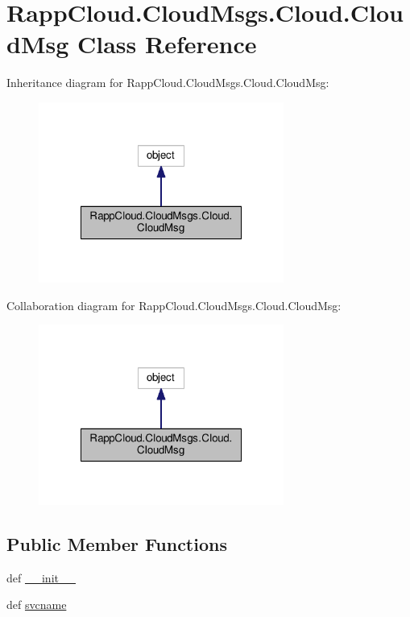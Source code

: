 \hypertarget{classRappCloud_1_1CloudMsgs_1_1Cloud_1_1CloudMsg}{\section{Rapp\-Cloud.\-Cloud\-Msgs.\-Cloud.\-Cloud\-Msg Class Reference}
\label{classRappCloud_1_1CloudMsgs_1_1Cloud_1_1CloudMsg}
}


Inheritance diagram for Rapp\-Cloud.\-Cloud\-Msgs.\-Cloud.\-Cloud\-Msg\-:
\nopagebreak
\begin{figure}[H]
\begin{center}
\leavevmode
\includegraphics[width=228pt]{classRappCloud_1_1CloudMsgs_1_1Cloud_1_1CloudMsg__inherit__graph}
\end{center}
\end{figure}


Collaboration diagram for Rapp\-Cloud.\-Cloud\-Msgs.\-Cloud.\-Cloud\-Msg\-:
\nopagebreak
\begin{figure}[H]
\begin{center}
\leavevmode
\includegraphics[width=228pt]{classRappCloud_1_1CloudMsgs_1_1Cloud_1_1CloudMsg__coll__graph}
\end{center}
\end{figure}
\subsection*{Public Member Functions}
\begin{DoxyCompactItemize}
\item 
def \hyperlink{classRappCloud_1_1CloudMsgs_1_1Cloud_1_1CloudMsg_afb06d9320e81cf5bf820bbebaccea568}{\-\_\-\-\_\-init\-\_\-\-\_\-}
\item 
def \hyperlink{classRappCloud_1_1CloudMsgs_1_1Cloud_1_1CloudMsg_a27d52f9afc641c840b078c7f0df37834}{svcname}
\end{DoxyCompactItemize}
